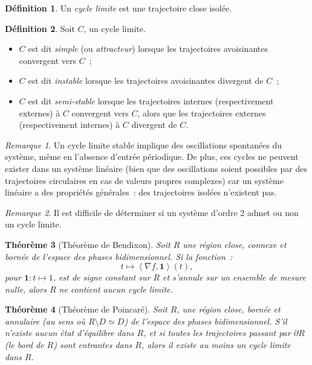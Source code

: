 \documentclass{article}
\newtheorem{thm}{Théorème}[section]
\theoremstyle{definition}
\newtheorem{déf}[thm]{Définition}
\theoremstyle{remark}
\newtheorem*{rmq}{Remarque}
\newcommand{\scpr}[2]{{\left\langle#1, #2\right\rangle}}
\begin{document}
	\begin{déf} Un \textit{cycle limite} est une trajectoire close isolée.
	\end{déf}

	\begin{déf} Soit $C$, un cycle limite.

	\begin{itemize}
		\item $C$ est dit \textit{simple} (ou \textit{attracteur}) lorsque les trajectoires avoisinantes convergent vers $C$~;
		\item $C$ est dit \textit{instable} lorsque les trajectoires avoisinantes divergent de $C$~;
		\item $C$ est dit \textit{semi-stable} lorsque les trajectoires internes (respectivement externes) à $C$ convergent vers $C$, alors que les trajectoires
		externes (respectivement internes) à $C$ divergent de $C$.
	\end{itemize}
	\end{déf}

	\begin{rmq} Un cycle limite stable implique des oscillations spontanées du système, même en l'absence d'entrée périodique. De plus, ces cycles ne peuvent
	exister dans un système linéaire (bien que des oscillations soient possibles par des trajectoires circulaires en cas de valeurs propres complexes) car un
	système linéaire a des propriétés générales~: des trajectoires isolées n'existent pas.
	\end{rmq}

	\begin{rmq} Il est difficile de déterminer si un système d'ordre 2 admet ou non un cycle limite.
	\end{rmq}

	\begin{thm}[Théorème de Bendixon] Soit $R$ une région close, connexe et bornée de l'espace des phases bidimensionnel. Si la fonction~:
	\[t \mapsto \scpr {\nabla f}{\mathbf 1}(t),\]
	pour $\mathbf 1 : t \mapsto 1$, est de signe constant sur $R$ et s'annule sur un ensemble de mesure nulle, alors $R$ ne contient aucun cycle limite.
	\end{thm}

	\begin{thm}[Théorème de Poincaré] Soit $R$, une région close, bornée et annulaire (au sens où $R \setminus D \simeq D$) de l'espace des phases
	bidimensionnel. S'il n'existe aucun état d'équilibre dans $R$, et si toutes les trajectoires passant par $\partial R$ (le bord de $R$) sont entrantes dans
	$R$, alors il existe au moins un cycle limite dans $R$.
	\end{thm}
\end{document}
